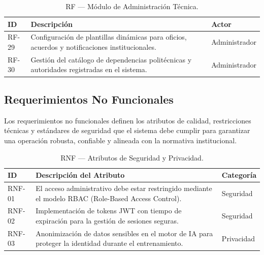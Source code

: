 \documentclass[12pt, oneside, letterpaper]{book}
\begin{document}
\begin{table}[H]
\centering
\caption{RF — Módulo de Administración Técnica.}
\begin{tabularx}{\textwidth}{@{} l L l @{}}
\toprule
{}
\textbf{\color{white} ID} & \textbf{\color{white} Descripción} & \textbf{\color{white} Actor} \\ \midrule
{}
RF-29 & Configuración de plantillas dinámicas para oficios, acuerdos y notificaciones institucionales. & Administrador \\
RF-30 & Gestión del catálogo de dependencias politécnicas y autoridades registradas en el sistema. & Administrador \\ \bottomrule
\end{tabularx}
\end{table}


\subsection{Requerimientos No Funcionales}

Los requerimientos no funcionales definen los atributos de calidad,
restricciones técnicas y estándares de seguridad que el sistema debe cumplir
para garantizar una operación robusta, confiable y alineada con la normativa
institucional.

\begin{table}[H]
\centering
\caption{RNF — Atributos de Seguridad y Privacidad.}
\begin{tabularx}{\textwidth}{@{} l L l @{}}
\toprule
{}
\textbf{\color{white} ID} & \textbf{\color{white} Descripción del Atributo} & \textbf{\color{white} Categoría} \\ \midrule
{}
RNF-01 & El acceso administrativo debe estar restringido mediante el modelo RBAC (Role-Based Access Control). & Seguridad \\
RNF-02 & Implementación de tokens JWT con tiempo de expiración para la gestión de sesiones seguras. & Seguridad \\
RNF-03 & Anonimización de datos sensibles en el motor de IA para proteger la identidad durante el entrenamiento. & Privacidad \\ \bottomrule
\end{tabularx}
\end{table}
\end{document}
